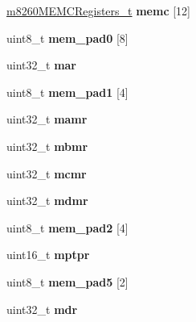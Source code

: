 \begin{DoxyCompactItemize}
\mbox{\hyperlink{structm8260MEMCRegisters__}{m8260\+M\+E\+M\+C\+Registers\+\_\+t}} {\bfseries memc} \mbox{[}12\mbox{]}
\item 
\mbox{\label{structm8260___a90c27210c374a05032e599c73fa85af2}} 
uint8\+\_\+t {\bfseries mem\+\_\+pad0} \mbox{[}8\mbox{]}
\item 
\mbox{\label{structm8260___a8cb4f783acfdb73907c5c34158709e31}} 
uint32\+\_\+t {\bfseries mar}
\item 
\mbox{\label{structm8260___a4a3c9da26c4cdc5be7aaac4578b656a3}} 
uint8\+\_\+t {\bfseries mem\+\_\+pad1} \mbox{[}4\mbox{]}
\item 
\mbox{\label{structm8260___af407ea08e1f804e9d1a8cb575b1c28af}} 
uint32\+\_\+t {\bfseries mamr}
\item 
\mbox{\label{structm8260___ab23404443011332096249568a7dc0015}} 
uint32\+\_\+t {\bfseries mbmr}
\item 
\mbox{\label{structm8260___a2b961a4f978db55449061a652e64193d}} 
uint32\+\_\+t {\bfseries mcmr}
\item 
\mbox{\label{structm8260___adfe88b92a29338101621c72cab700fa4}} 
uint32\+\_\+t {\bfseries mdmr}
\item 
\mbox{\label{structm8260___a4a3ef56778d7a899147c6dae6a3f1ea4}} 
uint8\+\_\+t {\bfseries mem\+\_\+pad2} \mbox{[}4\mbox{]}
\item 
\mbox{\label{structm8260___a07549bdf260d5f727b110416f9156805}} 
uint16\+\_\+t {\bfseries mptpr}
\item 
\mbox{\label{structm8260___ae55c2cc848c187a4f85145c71fc0112e}} 
uint8\+\_\+t {\bfseries mem\+\_\+pad5} \mbox{[}2\mbox{]}
\item 
\mbox{\label{structm8260___aca0b9efb898d6f99ddfee95670757653}} 
uint32\+\_\+t {\bfseries mdr}
\item 
\mbox{\label{structm8260___a54c66a1298f9fdbbf065d011faf615d1}} 

\end{DoxyCompactItemize}
